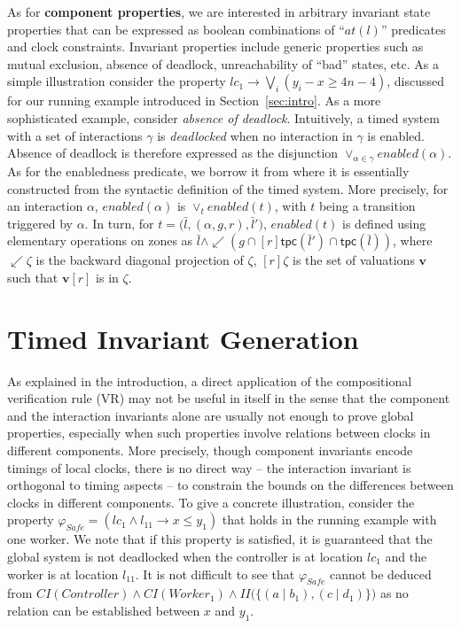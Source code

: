 \documentclass{LMCS}
\newcommand{\en}{\mathit{enabled}}
\newcommand{\inv}{\mathsf{tpc}}
\newcommand{\ctn}{\mathit{Controller}}
\newcommand{\cwkO}{\mathit{Worker}_1}
\newcommand{\ic}{\mathit{CI}}
\newcommand{\iim}{\mathit{II}}
\theoremstyle{plain}\newtheorem{remark}[thm]{Remark}
\theoremstyle{plain}\newtheorem{example}[thm]{Example}
\begin{document}
As for \textbf{component properties}, we are interested in arbitrary
invariant state properties that can be expressed as boolean
combinations of ``$\mathit{at}(l)$'' predicates and clock constraints.
Invariant properties include generic properties such as mutual
exclusion, absence of deadlock, unreachability of ``bad'' states, etc.
As a simple illustration consider the property $lc_1 \rightarrow
\bigvee_i (y_i - x \geq 4n - 4)$, discussed for our running example
introduced in Section~\ref{sec:intro}.  As a more sophisticated
example, consider \textit{absence of deadlock}.  Intuitively, a timed
system with a set of interactions $\gamma$ is \textit{deadlocked} when
no interaction in $\gamma$ is enabled.  Absence of deadlock is
therefore expressed as the disjunction $\vee_{\alpha \in \gamma}
enabled(\alpha)$. As for the enabledness predicate, we borrow it from
\cite{tripakis99:progress} where it is essentially constructed from
the syntactic definition of the timed system. More precisely, for an
interaction $\alpha$, $\en(\alpha)$ is $\vee_t \en(t)$, with $t$ being
a transition triggered by $\alpha$.  In turn, for $t = \big(\bar{l},
(\alpha, g, r), \bar{l}'\big)$, $\en(t)$ is defined using elementary
operations on zones as $\bar{l} \wedge \swarrow (g \cap
[r]\inv(\bar{l}') \cap \inv(\bar{l}))$, where $\swarrow \zeta$ is the
backward diagonal projection of $\zeta$, $[r]\zeta$ is the set of
valuations $\mathbf{v}$ such that $\mathbf{v}[r]$ is in $\zeta$.






\section{Timed Invariant Generation}
\label{s:bm}

As explained in the introduction, a direct application of the
compositional verification rule (VR) may not be useful in itself in
the sense that the component and the interaction invariants alone are
usually not enough to prove global properties, especially when such
properties involve relations between clocks in different
components. More precisely, though component invariants encode timings
of local clocks, there is no direct way -- the interaction invariant
is orthogonal to timing aspects -- to constrain the bounds on the
differences between clocks in different components. To give a concrete
illustration, consider the property $\varphi_{\mathit Safe} = (lc_1
\wedge l_{11} \rightarrow x \leq y_1)$ that holds in the running
example with one worker. We note that if this property is satisfied,
it is guaranteed that the global system is not deadlocked when the
controller is at location $lc_1$ and the worker is at location
$l_{11}$.  It is not difficult to see that $\varphi_{\mathit Safe}$
cannot be deduced from $\ic(\ctn) \wedge \ic(\cwkO) \wedge
\iim\big(\{(a\mid b_1), (c \mid d_1)\}\big)$ as no relation can be
established between $x$ and $y_1$.
\end{document}

